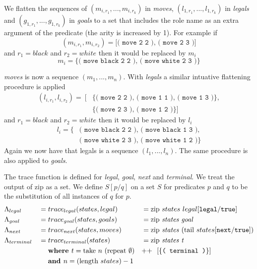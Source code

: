 We flatten the sequences of $(m_{i,r_1},...,m_{i,r_k})$ in \textit{moves}, $(l_{1,r_1},...,l_{1,r_k})$ in \textit{legals} and $(g_{1,r_1},...,g_{1,r_k})$ in \textit{goals} to a set that includes the role name as an extra argument of the predicate (the arity is increased by 1). For example if \[(m_{i,r_1},m_{i,r_2}) = \texttt{[( move 2 2 ), ( move 2 3 )]}\]
and $r_1 = black$ and $r_2 = white$ then it would be replaced by $m_i$
\[m_i = \texttt{\{( move black 2 2 ), ( move white 2 3 )\}}\]

\textit{moves} is now a sequence $(m_1,...,m_n)$. With \textit{legals} a similar intuative flattening procedure is applied
\begin{align*}
(l_{i,r_1},l_{i,r_2}) =\ [&\{\texttt{( move 2 2 ), ( move 1 1 ), ( move 1 3 )}\}, \\
&\{\texttt{( move 2 3 ), ( move 1 2 )}\}]
\end{align*}
and $r_1 = black$ and $r_2 = white$ then it would be replaced by $l_i$
\begin{align*}
l_i = \{&\texttt{( move black 2 2 ), ( move black 1 3 ),}\\ &\texttt{( move white 2 3 ), ( move white 1 2 )}\}
\end{align*}
Again we now have that legals is a sequence $(l_1,...,l_n)$. The same procedure is also applied to \textit{goals}.


The trace function is defined for \textit{legal}, \textit{goal}, \textit{next} and \textit{terminal}. We treat the output of zip as a set. We define $S[p/q]$ on a set $S$ for predicates $p$ and $q$ to be the substitution of all instances of $q$ for $p$.
\begin{align*}
&\Lambda_{legal} &&= trace_{legal}(states,legal) &&= \text{zip } states\ legal[\texttt{legal}/\texttt{true}] \\
&\Lambda_{goal} &&= trace_{goal}(states,goals) &&= \text{zip \textit{states goal}} \\
&\Lambda_{next} &&= trace_{next}(states,moves) &&= \text{zip \textit{states} } \text{(tail }states[\texttt{next}/\texttt{true}]) \\
&\Lambda_{terminal} &&= trace_{terminal}(states) &&= \text{zip \textit{states t}} \\
&&&\ \ \ \ \textbf{where  } t =\text{take } n\ (\text{repeat } \emptyset ) &&\text{++}\ \ [\{\texttt{( terminal )}\}] \\
&&&\ \ \ \ \textbf{and } n = (\text{length }states) - 1 &&
\end{align*}

